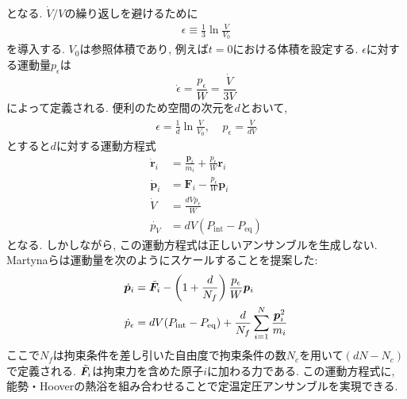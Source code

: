となる.
$\dot{V}/V$の繰り返しを避けるために
\begin{align}
 \epsilon \equiv \frac{1}{3} \ln \frac{V}{V_{0}}
\end{align}
を導入する.
$V_{0}$は参照体積であり, 例えば$t=0$における体積を設定する.
$\epsilon$に対する運動量$p_{\epsilon}$は
\begin{equation}
 \dot{\epsilon} = \frac{p_{\epsilon}}{W} = \frac{\dot{V}}{3V}
\end{equation}
によって定義される.
便利のため空間の次元を$d$とおいて,
\begin{align}
 \epsilon     = \frac{1}{d} \ln \frac{V}{V_{0}}, ~~~~~
 p_{\epsilon} = \frac{\dot{V}}{dV}
\end{align}
とすると$d$に対する運動方程式
\begin{align}
 \dot{\bm{r}}_{i} &= \frac{\bm{p}_{i}}{m_{i}} + \frac{p_{\epsilon}}{W} \bm{r}_{i} \\
 \dot{\bm{p}}_{i} &= \bm{F}_{i} - \frac{p_{\epsilon}}{W} \bm{p}_{i} \\
 \dot{V}          &= \frac{dV p_{\epsilon}}{W} \\
 \dot{p_{V}}      &= dV (P_{\mathrm{int}} - P_{\mathrm{eq}})
\end{align}
となる.
しかしながら, この運動方程式は正しいアンサンブルを生成しない. 
Martyna\cite{1994Martyna}らは運動量を次のようにスケールすることを提案した:
\begin{align}
  \dot{\bm{p}}_{i}   &= \Tilde{\bm{F}}_{i}
                      - \left(1 + \frac{d}{N_{f}} \right) \frac{p_{\epsilon}}{W} \bm{p}_{i} \\
  \dot{p}_{\epsilon} &= dV (P_{\mathrm{int}} - P_{\mathrm{eq}})
                      + \frac{d}{N_{f}} \sum_{i=1}^{N} \frac{\bm{p}_{i}^{2}}{m_{i}}
\end{align}
ここで$N_{f}$は拘束条件を差し引いた自由度で拘束条件の数$N_{c}$を用いて$(dN - N_{c})$で定義される.
$\Tilde{\bm{F}}_{i}$は拘束力を含めた原子$i$に加わる力である.
この運動方程式に, 能勢・Hooverの熱浴を組み合わせることで定温定圧アンサンブルを実現できる.





